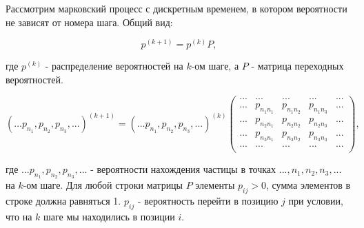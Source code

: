 \documentclass[a4paper]{report}
\begin{document}
Рассмотрим марковский процесс с дискретным временем, в котором вероятности не зависят от номера шага. Общий вид:

\begin{equation} \label{eq:1}
    p^{(k+1)} = p^{(k)}P,
\end{equation}

где $p^{(k)}$ - распределение вероятностей на $k$-ом шаге, а $P$ - матрица переходных вероятностей.

\begin{equation} \label{eq:2}
    ( ... p_{n_{1}}, p_{n_{2}}, p_{n_{3}}, ... )^{(k+1)} = ( ... p_{n_{1}}, p_{n_{2}}, p_{n_{3}}, ... )^{(k)}\left(
                                                                                                               \begin{array}{ccccc}
                                                                                                                 ... & ... & ... & ... & ... \\
                                                                                                                 ... & p_{n_{1}n_{1}} & p_{n_{1}n_{2}} & p_{n_{1}n_{3}} & ... \\
                                                                                                                 ... & p_{n_{2}n_{1}} & p_{n_{2}n_{2}} & p_{n_{2}n_{3}} & ... \\
                                                                                                                 ... & p_{n_{3}n_{1}} & p_{n_{3}n_{2}} & p_{n_{3}n_{3}} & ... \\
                                                                                                                 ... & ... & ... & ... &... \\
                                                                                                               \end{array}
                                                                                                             \right)
    ,
\end{equation}

где $... p_{n_{1}}, p_{n_{2}}, p_{n_{3}}, ... $ - вероятности нахождения частицы в точках $..., n_{1}, n_{2}, n_{3}, ...$ на $k$-ом шаге. Для любой строки матрицы $P$ элементы $p_{ij} > 0$, сумма элементов в строке должна равняться 1. $p_{ij}$ - вероятность перейти в позицию $j$ при условии, что на $k$ шаге мы находились в позиции $i$.
\end{document}
